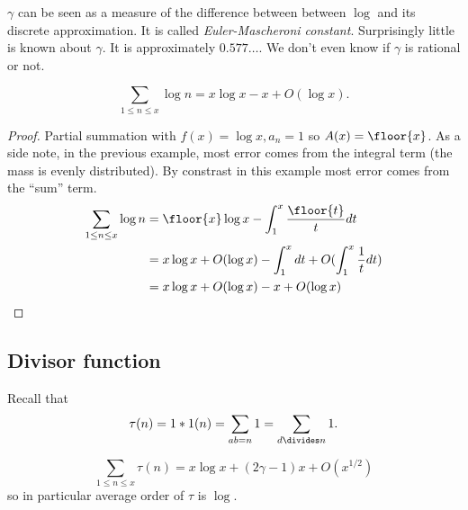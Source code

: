 \documentclass[a4paper]{article}
\begin{document}
\(\gamma\) can be seen as a measure of the difference between between \(\log\) and its discrete approximation. It is called \emph{Euler-Mascheroni constant}. 
Surprisingly little is known about \(\gamma\). It is approximately \(0.577\dots\). We don't even know if \(\gamma\) is rational or not.

\begin{lemma}
  \[
    \sum_{1 \leq n \leq x} \log n = x \log x - x + O(\log x).
  \]
\end{lemma}

\begin{proof}
  Partial summation with \(f(x) = \log x, a_n = 1\) so \(A(x) = \floor{x}\). As a side note, in the previous example, most error comes from the integral term (the mass is evenly distributed). By constrast in this example most error comes from the ``sum'' term.
  \begin{align*}
    \sum_{1 \leq n \leq x} \log n
    &= \floor{x} \log x - \int_1^x \frac{\floor{t}}{t} dt \\
    &= x \log x + O(\log x) - \int_1^x dt + O(\int_1^x \frac{1}{t}dt) \\
    &= x \log x + O(\log x) - x + O(\log x)
  \end{align*}
\end{proof}

\subsection{Divisor function}

Recall that
\[
  \tau(n) = 1 * 1(n) = \sum_{ab = n} 1 = \sum_{d \divides n} 1.
\]

\begin{theorem}
  \[
    \sum_{1 \leq n \leq x} \tau(n) = x \log x + (2 \gamma - 1) x + O(x^{1/2})
  \]
  so in particular average order of \(\tau\) is \(\log\).
\end{theorem}
\end{document}
